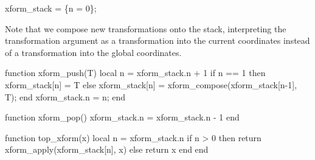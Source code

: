 \nwenddocs{}\endmoddef
xform_stack = \{n = 0\};

\nwendcode{}\nwdocspar

Note that we compose new transformations onto the stack, interpreting
the transformation argument as a transformation into the current coordinates
instead of a transformation into the global coordinates.

\nwenddocs{}\endmoddef
function xform_push(T)
  local n = xform_stack.n + 1
  if n == 1 then
    xform_stack[n] = T
  else
    xform_stack[n] = xform_compose(xform_stack[n-1], T);
  end
  xform_stack.n = n;
end

\nwendcode{}\nwdocspar

\nwenddocs{}\plusendmoddef
function xform_pop()
  xform_stack.n = xform_stack.n - 1
end

\nwendcode{}\nwdocspar

\nwenddocs{}\plusendmoddef
function top_xform(x)
  local n = xform_stack.n
  if n > 0 then
    return xform_apply(xform_stack[n], x)
  else
    return x
  end
end 

\nwendcode{}\nwdocspar

